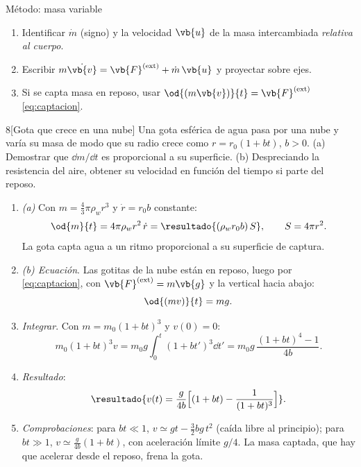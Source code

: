 \begin{clave}{Método: masa variable}
\begin{enumerate}[leftmargin=1.4em]
  \item Identificar $\dot m$ (signo) y la velocidad $\vb{u}$ de la masa intercambiada
        \emph{relativa al cuerpo}.
  \item Escribir $m\dot{\vb{v}}=\vb{F}\ext+\dot m\,\vb{u}$ y proyectar sobre ejes.
  \item Si se capta masa en reposo, usar $\od{(m\vb{v})}{t}=\vb{F}\ext$ \eqref{eq:captacion}.
\end{enumerate}
\end{clave}

\begin{problema}{8}[Gota que crece en una nube]
\label{prob:8}
Una gota esférica de agua pasa por una nube y varía su masa de modo que su
radio crece como $r=r_{0}(1+bt)$, $b>0$. (a) Demostrar que $\dd m/\dd t$ es
proporcional a su superficie. (b) Despreciando la resistencia del aire, obtener
su velocidad en función del tiempo si parte del reposo.
\end{problema}

\begin{resolucion}
\begin{enumerate}
  \item \emph{(a)} Con $m=\tfrac43\pi\rho_{w}r^{3}$ y $\dot r=r_{0}b$ constante:
  \[
    \od{m}{t}=4\pi\rho_{w}r^{2}\,\dot r=\resultado{(\rho_{w}r_{0}b)\,S},\qquad S=4\pi r^{2}.
  \]
  La gota capta agua a un ritmo proporcional a su superficie de captura.
  \item \emph{(b) Ecuación}. Las gotitas de la nube están en reposo, luego por
  \eqref{eq:captacion}, con $\vb{F}\ext=m\vb{g}$ y la vertical hacia abajo:
  \[
    \od{(mv)}{t}=mg .
  \]
  \item \emph{Integrar}. Con $m=m_{0}(1+bt)^{3}$ y $v(0)=0$:
  \[
    m_{0}(1+bt)^{3}v=m_{0}g\int_{0}^{t}(1+bt')^{3}\dd t'=m_{0}g\,\frac{(1+bt)^{4}-1}{4b}.
  \]
  \item \emph{Resultado}:
  \[
    \resultado{v(t)=\frac{g}{4b}\Bigl[(1+bt)-\frac{1}{(1+bt)^{3}}\Bigr]} .
  \]
  \item \emph{Comprobaciones}: para $bt\ll1$, $v\simeq gt-\tfrac32bg\,t^{2}$ (caída libre al
  principio); para $bt\gg1$, $v\simeq\tfrac{g}{4b}(1+bt)$, con aceleración límite $g/4$.
  La masa captada, que hay que acelerar desde el reposo, frena la gota.\qedhere
\end{enumerate}
\end{resolucion}

